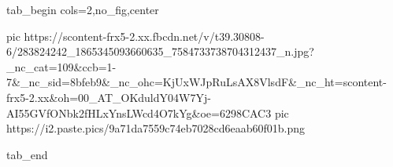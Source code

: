  
 
 
 
 

\ifcmt
  tab_begin cols=2,no_fig,center

     pic https://scontent-frx5-2.xx.fbcdn.net/v/t39.30808-6/283824242_1865345093660635_7584733738704312437_n.jpg?_nc_cat=109&ccb=1-7&_nc_sid=8bfeb9&_nc_ohc=KjUxWJpRuLsAX8VlsdF&_nc_ht=scontent-frx5-2.xx&oh=00_AT_OKduldY04W7Yj-AI55GVfONbk2fHLxYnsLWcd4O7kYg&oe=6298CAC3
		 pic https://i2.paste.pics/9a71da7559c74eb7028cd6eaab60f01b.png


  tab_end
\fi
